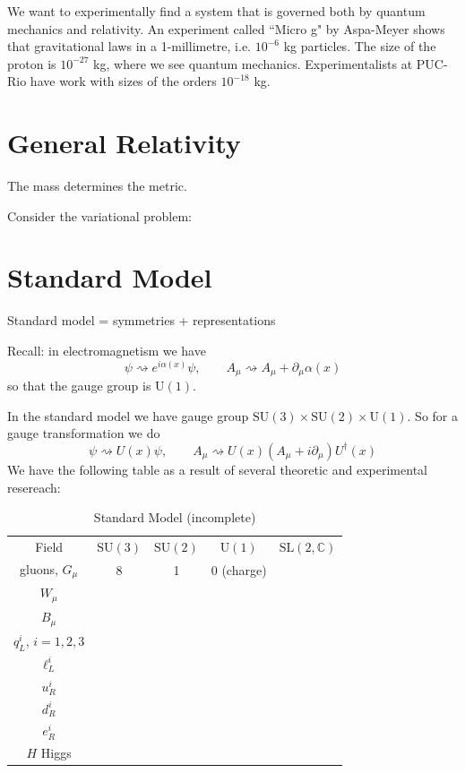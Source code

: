 \documentclass{book}
\begin{document}
{We want to experimentally find a system that
is governed both by quantum
mechanics and relativity. An experiment
called ``Micro g" by Aspa-Meyer shows
that gravitational laws in a 1-millimetre,
i.e. $10^{-6}$ kg particles. The size
of the proton is $10^{-27}$ kg, where we see
quantum mechanics. Experimentalists
at PUC-Rio have work with sizes of the orders
$10^{-18}$ kg.

\section{General Relativity}
\label{section-general-relativity}
\begin{slogan}
The mass determines the metric.
\end{slogan}
Consider the variational problem:

\section{Standard Model}
\label{section-standard-model}

\begin{slogan}
Standard model = symmetries + representations
\end{slogan}

Recall: in electromagnetism we have
$$
\psi\rightsquigarrow
e^{i\alpha(x)}\psi,\qquad
A_\mu\rightsquigarrow
A_\mu+\partial_\mu\alpha(x)
$$
so that the gauge group is $\text{U}(1)$.

In the standard model we have gauge group
$\text{SU}(3)\times\text{SU}(2)\times\text{U}
(1)$.
So for a gauge transformation
we do
$$
\psi\rightsquigarrow U(x)\psi,\qquad
A_\mu\rightsquigarrow
U(x)(A_\mu+i\partial_\mu)U^\dag(x)
$$
We have the following table as a result of
several theoretic and experimental
resereach:
\begin{table}
\centering
\caption{Standard Model (incomplete)}
\label{tab:standard-model}
\begin{tabular}{c c c c c}
Field &	$\text{SU}(3)$ & $\text{SU}(2)$ &
$\text{U}(1)$ &
$\text{SL}(2,\mathbb{C})$ \\
gluons, $G_\mu$ & 8 & 1 & 0 (charge) & \\
$W_\mu$ & & & &\\
$B_\mu$ &&&&\\
\hline
$q^i_L$, $i=1,2,3$ &&&&\\
$\ell^i_L$ &&&&\\
$u^i_R$ &&&&\\
$d^i_R$ &&&&\\
$e^i_R$ &&&&\\
\hline
$H$ Higgs &&&&
\end{tabular}
\end{table}

}
\end{document}
